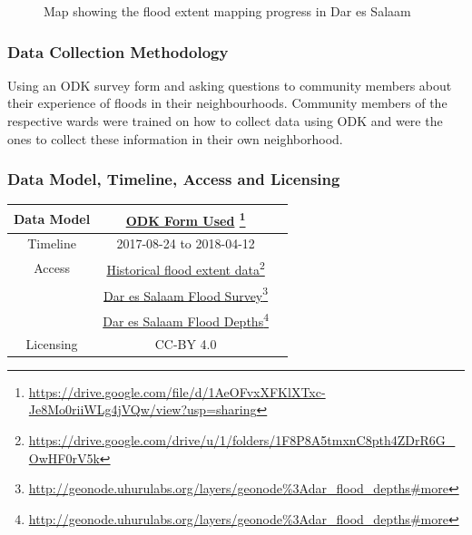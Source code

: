 \documentclass[a4paper,12pt,twoside]{article}
\begin{document}
\begin{figure}[h]
  \color{RHgreen}\caption{Map showing the flood extent mapping progress in Dar es Salaam}
  \centering
\end{figure}

\subsubsection{Data Collection Methodology}
Using an ODK survey form and asking questions to community members about their experience of floods in their neighbourhoods. Community members of the respective wards were trained on how to collect data using ODK and were the ones to collect these information in their own neighborhood.

\subsubsection{Data Model, Timeline, Access and Licensing}
\begin{center}
\begin{tabular}{|c|c|c|}  
\hline
Data Model &  \href{https://drive.google.com/file/d/1AeOFvxXFKlXTxc-Je8Mo0riiWLg4jVQw/view?usp=sharing
}{ODK Form Used} \footnote{\url{https://drive.google.com/file/d/1AeOFvxXFKlXTxc-Je8Mo0riiWLg4jVQw/view?usp=sharing}} \\
 \hline
  Timeline  &  2017-08-24 to 2018-04-12 \\
\hline  
 Access  & 
    \href{https://drive.google.com/drive/u/1/folders/1F8P8A5tmxnC8pth4ZDrR6G_OwHF0rV5k}{Historical flood extent data}\footnote{\url{https://drive.google.com/drive/u/1/folders/1F8P8A5tmxnC8pth4ZDrR6G_OwHF0rV5k}}\\
{} & 
    \href{http://geonode.uhurulabs.org/layers/geonode\%3Adar_flood_depths#more}{Dar es Salaam Flood Survey}\footnote{\url{http://geonode.uhurulabs.org/layers/geonode\%3Adar_flood_depths#more}}\\
 {} &    
     \href{http://geonode.uhurulabs.org/layers/geonode\%3Adar_flood_depths#more}{Dar es Salaam Flood Depths}\footnote{\url{http://geonode.uhurulabs.org/layers/geonode\%3Adar_flood_depths#more}} \\
\hline
Licensing   &  CC-BY 4.0 \\
\hline
\end{tabular}
\end{center}
\end{document}

